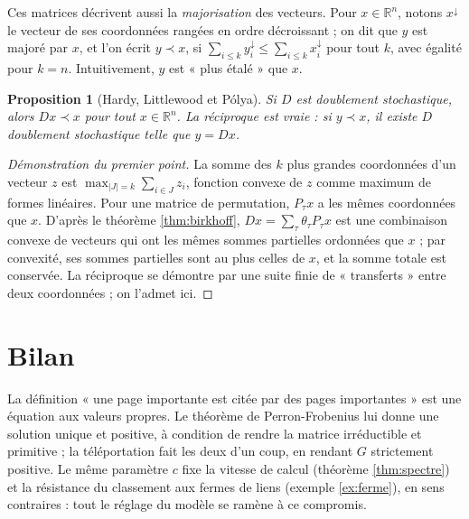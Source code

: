 \documentclass[11pt,a4paper]{article}
\theoremstyle{plain}
\newtheorem{proposition}[theoreme]{Proposition}
\theoremstyle{definition}
\theoremstyle{remark}
\newcommand{\R}{\mathbb{R}}
\begin{document}
Ces matrices décrivent aussi la \emph{majorisation} des vecteurs. Pour $x\in\R^n$, notons $x^\downarrow$ le vecteur de ses coordonnées rangées en ordre décroissant ; on dit que $y$ est majoré par $x$, et l'on écrit $y\prec x$, si $\sum_{i\leq k}y^\downarrow_i\leq\sum_{i\leq k}x^\downarrow_i$ pour tout $k$, avec égalité pour $k=n$. Intuitivement, $y$ est « plus étalé » que $x$.

\begin{proposition}[Hardy, Littlewood et Pólya]\label{prop:hlp}
Si $D$ est doublement stochastique, alors $Dx\prec x$ pour tout $x\in\R^n$. La réciproque est vraie : si $y\prec x$, il existe $D$ doublement stochastique telle que $y=Dx$.
\end{proposition}

\begin{proof}[Démonstration du premier point]
La somme des $k$ plus grandes coordonnées d'un vecteur $z$ est $\max_{|J|=k}\sum_{i\in J}z_i$, fonction convexe de $z$ comme maximum de formes linéaires. Pour une matrice de permutation, $P_\tau x$ a les mêmes coordonnées que $x$. D'après le théorème \ref{thm:birkhoff}, $Dx=\sum_\tau\theta_\tau P_\tau x$ est une combinaison convexe de vecteurs qui ont les mêmes sommes partielles ordonnées que $x$ ; par convexité, ses sommes partielles sont au plus celles de $x$, et la somme totale est conservée. La réciproque se démontre par une suite finie de « transferts » entre deux coordonnées ; on l'admet ici.
\end{proof}


\section{Bilan}

La définition « une page importante est citée par des pages importantes » est une équation aux valeurs propres. Le théorème de Perron-Frobenius lui donne une solution unique et positive, à condition de rendre la matrice irréductible et primitive ; la téléportation fait les deux d'un coup, en rendant $G$ strictement positive. Le même paramètre $c$ fixe la vitesse de calcul (théorème \ref{thm:spectre}) et la résistance du classement aux fermes de liens (exemple \ref{ex:ferme}), en sens contraires : tout le réglage du modèle se ramène à ce compromis.
\end{document}
